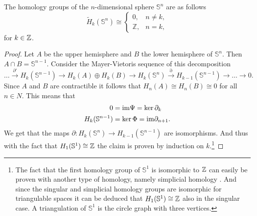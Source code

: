 \begin{ex}
  The homology groups of the $n$-dimensional sphere $\mathbb{S}^n$ are as follows
  \begin{equation*}
    \tilde{H}_k(\mathbb{S}^n) \cong \begin{cases}
      0, &n \neq k, \\
      \mathbb{Z}, &n = k,
    \end{cases}
  \end{equation*}
  for $k \in \mathbb{Z}$.
\end{ex}

\begin{proof}
  Let $A$ be the upper hemisphere and $B$ the lower hemisphere of $\mathbb{S}^n$. Then $A\cap B = \mathbb{S}^{n-1}$. Consider the Mayer-Vietoris sequence of this decomposition
  \begin{equation*}
    \ldots \overset{\partial'}{\to} H_k(\mathbb{S}^{n-1}) \to H_k(A) \oplus H_k(B) \to H_k(\mathbb{S}^n) \overset{\partial}{\to} H_{k-1}(\mathbb{S}^{n-1}) \to \ldots \to 0.
  \end{equation*}
  Since $A$ and $B$ are contractible it follows that $H_n(A) \cong H_n(B) \cong 0$ for all $n \in N$. This means that
  \begin{align*}
    0 &= {\rm im} \Psi = \ker \partial_k \\
    H_k(\mathbb{S}^{n-1}) &= \ker \Phi = {\rm im} \partial_{n+1}.
  \end{align*}
  We get that the maps $\partial\colon H_k(\mathbb{S}^n) \to H_{k-1}(\mathbb{S}^{n-1})$ are isomorphisms. And thus with the fact that $H_1(\mathbb{S}^1) \cong \mathbb{Z}$ the claim is proven by induction on $k$.\footnote{The fact that the first homology group of $\mathbb{S}^1$ is isomorphic to $\mathbb{Z}$ can easily be proven with another type of homology, namely simplicial homology \cite[p. 106]{hatcher}. And since the singular and simplicial homology groups are isomorphic for triangulable spaces it can be deduced that $H_1(\mathbb{S}^1) \cong \mathbb{Z}$ also in the singular case. A triangulation of $\mathbb{S}^1$ is the circle graph with three vertices.}
\end{proof}
